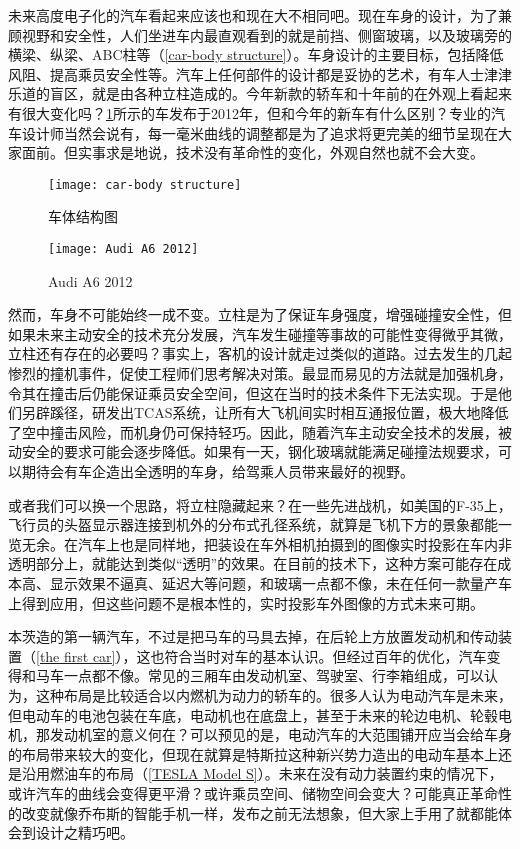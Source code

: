 \documentclass[UTF8]{ctexart}
\numberwithin{figure}{section}
\numberwithin{table}{section}
\begin{document}
未来高度电子化的汽车看起来应该也和现在大不相同吧。现在车身的设计，为了兼顾视野和安全性，人们坐进车内最直观看到的就是前挡、侧窗玻璃，以及玻璃旁的横梁、纵梁、ABC柱等（\cref{car-body structure}）。车身设计的主要目标，包括降低风阻、提高乘员安全性等。汽车上任何部件的设计都是妥协的艺术，有车人士津津乐道的盲区，就是由各种立柱造成的。今年新款的轿车和十年前的在外观上看起来有很大变化吗？\cref{Audi A6 2012}所示的车发布于2012年，但和今年的新车有什么区别？专业的汽车设计师当然会说有，每一毫米曲线的调整都是为了追求将更完美的细节呈现在大家面前。但实事求是地说，技术没有革命性的变化，外观自然也就不会大变。

\begin{figure}[htbp]
	\centering
	\begin{minipage}[b]{0.45\textwidth}
		\centering
		\texttt{[image: car-body structure]}
		\caption{车体结构图}
		\label{car-body structure}
	\end{minipage}
	\begin{minipage}[b]{0.5\textwidth}
		\centering
		\texttt{[image: Audi A6 2012]}
		\caption{Audi A6 2012}
		\label{Audi A6 2012}
	\end{minipage}
\end{figure}

然而，车身不可能始终一成不变。立柱是为了保证车身强度，增强碰撞安全性，但如果未来主动安全的技术充分发展，汽车发生碰撞等事故的可能性变得微乎其微，立柱还有存在的必要吗？事实上，客机的设计就走过类似的道路。过去发生的几起惨烈的撞机事件，促使工程师们思考解决对策。最显而易见的方法就是加强机身，令其在撞击后仍能保证乘员安全空间，但这在当时的技术条件下无法实现。于是他们另辟蹊径，研发出TCAS系统，让所有大飞机间实时相互通报位置，极大地降低了空中撞击风险，而机身仍可保持轻巧。因此，随着汽车主动安全技术的发展，被动安全的要求可能会逐步降低。如果有一天，钢化玻璃就能满足碰撞法规要求，可以期待会有车企造出全透明的车身，给驾乘人员带来最好的视野。

或者我们可以换一个思路，将立柱隐藏起来？在一些先进战机，如美国的F-35上，飞行员的头盔显示器连接到机外的分布式孔径系统，就算是飞机下方的景象都能一览无余。在汽车上也是同样地，把装设在车外相机拍摄到的图像实时投影在车内非透明部分上，就能达到类似“透明”的效果。在目前的技术下，这种方案可能存在成本高、显示效果不逼真、延迟大等问题，和玻璃一点都不像，未在任何一款量产车上得到应用，但这些问题不是根本性的，实时投影车外图像的方式未来可期。

本茨造的第一辆汽车，不过是把马车的马具去掉，在后轮上方放置发动机和传动装置（\cref{the first car}），这也符合当时对车的基本认识。但经过百年的优化，汽车变得和马车一点都不像。常见的三厢车由发动机室、驾驶室、行李箱组成，可以认为，这种布局是比较适合以内燃机为动力的轿车的。很多人认为电动汽车是未来，但电动车的电池包装在车底，电动机也在底盘上，甚至于未来的轮边电机、轮毂电机，那发动机室的意义何在？可以预见的是，电动汽车的大范围铺开应当会给车身的布局带来较大的变化，但现在就算是特斯拉这种新兴势力造出的电动车基本上还是沿用燃油车的布局（\cref{TESLA Model S}）。未来在没有动力装置约束的情况下，或许汽车的曲线会变得更平滑？或许乘员空间、储物空间会变大？可能真正革命性的改变就像乔布斯的智能手机一样，发布之前无法想象，但大家上手用了就都能体会到设计之精巧吧。
\end{document}
